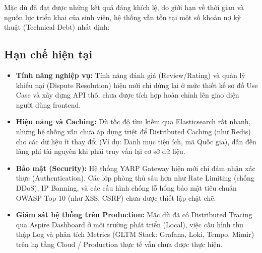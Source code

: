 Mặc dù đã đạt được những kết quả đáng khích lệ, do giới hạn về thời gian và nguồn lực triển khai của sinh viên, hệ thống vẫn tồn tại một số khoản nợ kỹ thuật (Technical Debt) nhất định:

\subsection{Hạn chế hiện tại}
\begin{itemize}
    \item \textbf{Tính năng nghiệp vụ:} Tính năng đánh giá (Review/Rating) và quản lý khiếu nại (Dispute Resolution) hiện mới chỉ dừng lại ở mức thiết kế sơ đồ Use Case và xây dựng API thô, chưa được tích hợp hoàn chỉnh lên giao diện người dùng frontend.
    \item \textbf{Hiệu năng và Caching:} Dù tốc độ tìm kiếm qua Elasticsearch rất nhanh, nhưng hệ thống vẫn chưa áp dụng triệt để Distributed Caching (như Redis) cho các dữ liệu ít thay đổi (Ví dụ: Danh mục tiện ích, mã Quốc gia), dẫn đến lãng phí tài nguyên khi phải truy vấn lại cơ sở dữ liệu.
    \item \textbf{Bảo mật (Security):} Hệ thống YARP Gateway hiện mới chỉ đảm nhận xác thực (Authentication). Các lớp phòng thủ sâu hơn như Rate Limiting (chống DDoS), IP Banning, và các cấu hình chống lỗ hổng bảo mật tiêu chuẩn OWASP Top 10 (như XSS, CSRF) chưa được thiết lập chặt chẽ.
    \item \textbf{Giám sát hệ thống trên Production:} Mặc dù đã có Distributed Tracing qua Aspire Dashboard ở môi trường phát triển (Local), việc cấu hình thu thập Log và phân tích Metrics (GLTM Stack: Grafana, Loki, Tempo, Mimir) trên hạ tầng Cloud / Production thực tế vẫn chưa được thực hiện.
\end{itemize}

